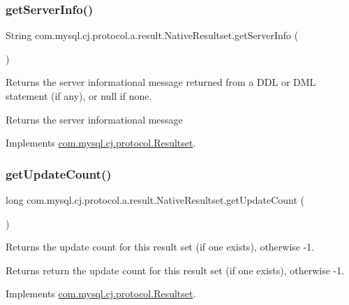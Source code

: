 \subsubsection{\texorpdfstring{get\+Server\+Info()}{getServerInfo()}}
{\footnotesize\ttfamily String com.\+mysql.\+cj.\+protocol.\+a.\+result.\+Native\+Resultset.\+get\+Server\+Info (\begin{DoxyParamCaption}{ }\end{DoxyParamCaption})}

Returns the server informational message returned from a D\+DL or D\+ML statement (if any), or null if none.

\begin{DoxyReturn}{Returns}
the server informational message 
\end{DoxyReturn}


Implements \mbox{\hyperlink{interfacecom_1_1mysql_1_1cj_1_1protocol_1_1_resultset_a41ec899fbc6875d7b31245be7245ae9a}{com.\+mysql.\+cj.\+protocol.\+Resultset}}.

\mbox{\label{classcom_1_1mysql_1_1cj_1_1protocol_1_1a_1_1result_1_1_native_resultset_a10bf057eb5f4fbf7602b519cd3e420b0}} 
\subsubsection{\texorpdfstring{get\+Update\+Count()}{getUpdateCount()}}
{\footnotesize\ttfamily long com.\+mysql.\+cj.\+protocol.\+a.\+result.\+Native\+Resultset.\+get\+Update\+Count (\begin{DoxyParamCaption}{ }\end{DoxyParamCaption})}

Returns the update count for this result set (if one exists), otherwise -\/1.

\begin{DoxyReturn}{Returns}
return the update count for this result set (if one exists), otherwise -\/1. 
\end{DoxyReturn}


Implements \mbox{\hyperlink{interfacecom_1_1mysql_1_1cj_1_1protocol_1_1_resultset_a72a3e90cf2affd2bbc8826a2c2e39df9}{com.\+mysql.\+cj.\+protocol.\+Resultset}}.

